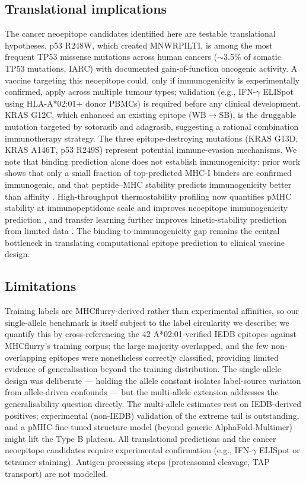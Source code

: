 \subsection{Translational implications}
The cancer neoepitope candidates identified here are testable translational hypotheses. p53 R248W, which created MNWRPILTI, is among the most frequent TP53 missense mutations across human cancers ($\sim$3.5\% of somatic TP53 mutations, IARC) with documented gain-of-function oncogenic activity. A vaccine targeting this neoepitope could, only if immunogenicity is experimentally confirmed, apply across multiple tumour types; validation (e.g., IFN-$\gamma$ ELISpot using HLA-A*02:01+ donor PBMCs) is required before any clinical development. KRAS G12C, which enhanced an existing epitope (WB$\rightarrow$SB), is the druggable mutation targeted by sotorasib and adagrasib, suggesting a rational combination immunotherapy strategy. The three epitope-destroying mutations (KRAS G13D, KRAS A146T, p53 R249S) represent potential immune-evasion mechanisms. We note that binding prediction alone does not establish immunogenicity: prior work shows that only a small fraction of top-predicted MHC-I binders are confirmed immunogenic, and that peptide--MHC stability predicts immunogenicity better than affinity \citep{Harndahl12,Backert15}. High-throughput thermostability profiling now quantifies pMHC stability at immunopeptidome scale and improves neoepitope immunogenicity prediction \citep{Jappe20}, and transfer learning further improves kinetic-stability prediction from limited data \citep{Fasoulis24}. The binding-to-immunogenicity gap remains the central bottleneck in translating computational epitope prediction to clinical vaccine design.

\subsection{Limitations}
Training labels are MHCflurry-derived rather than experimental affinities, so our single-allele benchmark is itself subject to the label circularity we describe; we quantify this by cross-referencing the 42 A*02:01-verified IEDB epitopes against MHCflurry's training corpus; the large majority overlapped, and the few non-overlapping epitopes were nonetheless correctly classified, providing limited evidence of generalisation beyond the training distribution. The single-allele design was deliberate --- holding the allele constant isolates label-source variation from allele-driven confounds --- but the multi-allele extension addresses the generalisability question directly. The multi-allele estimates rest on IEDB-derived positives; experimental (non-IEDB) validation of the extreme tail is outstanding, and a pMHC-fine-tuned structure model (beyond generic AlphaFold-Multimer) might lift the Type B plateau. All translational predictions and the cancer neoepitope candidates require experimental confirmation (e.g., IFN-$\gamma$ ELISpot or tetramer staining). Antigen-processing steps (proteasomal cleavage, TAP transport) are not modelled.
